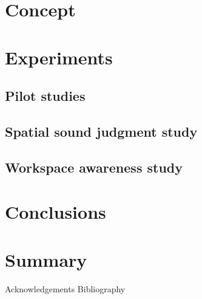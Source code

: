 \chapter{Concept}
\chapter{Experiments}
\section{Pilot studies}
\section{Spatial sound judgment study}
\section{Workspace awareness study}
\chapter{Conclusions}
\chapter{Summary}

Acknowledgements 
Bibliography







\begin{comment}
Methodology: approach to solving the problem; chosen HCI methodology for the final evaluation - no idea
a. Chosen HCI evaluation methodology
\end{comment}


